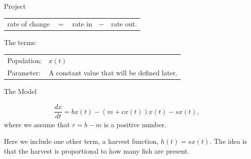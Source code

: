 \begin{frame}{Project}

  \begin{tabular}{rclcl}
    rate of change & $=$ & rate in & $-$ & rate out.
  \end{tabular}

  
\end{frame}


\begin{frame}{The terms:}

  \begin{tabular}{ll}
    Population: & $x(t)$ \\
    Parameter:  & A constant value that will be defined later.
  \end{tabular}
  
\end{frame}


\begin{frame}{The Model}

  \begin{eqnarray*}
    \dfrac{dx}{dt} =  bx(t) - (m+cx(t))x(t) - sx(t),
  \end{eqnarray*}
  where we assume that $r = b-m$ is a positive number.

  \vfill

  Here we include one other term, a harvest function, $h(t) = s x(t)$. The
  idea is that the harvest is proportional to how many fish are
  present.
 
\end{frame}

